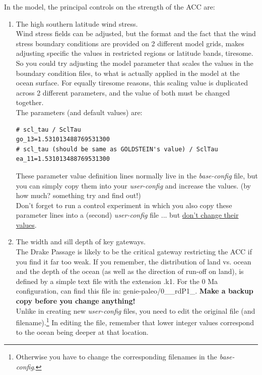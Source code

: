 \begin{enumerate}[noitemsep]
In the model, the principal controls on the strength of the ACC are:
\vspace{1mm}
\begin{enumerate}[noitemsep]
\item The high southern latitude wind stress.
\vspace{1mm}
\\Wind stress fields can be adjusted, but the format and the fact that the wind stress boundary conditions are provided on 2 different model grids, makes adjusting specific the values in restricted regions or latitude bands, tiresome. So you could try adjusting the model parameter that scales the values in the boundary condition files, to what is actually applied in the model at the ocean surface. For equally tiresome reasons, this scaling value is duplicated across 2 different parameters, and the value of both must be changed together.
\vspace{1mm}
\\The parameters (and default values) are:
\vspace{-1mm}\small\begin{verbatim}
# scl_tau / SclTau
go_13=1.531013488769531300
# scl_tau (should be same as GOLDSTEIN's value) / SclTau
ea_11=1.531013488769531300
\end{verbatim}\normalsize\vspace{-1mm}
These parameter value definition lines normally live in the \textit{base-config} file, but you can simply copy them into your \textit{user-config} and increase the values. (by how much? something try and find out!)
\\Don't forget to run a control experiment in which you also copy these parameter lines into a (second) \textit{user-config} file ... but \uline{don't change their values}.

\vspace{1mm}
\item The width and sill depth of key gateways.
\vspace{1mm}
\\The Drake Passage is likely to be the critical gateway restricting the ACC if you find it far too weak. If you remember, the distribution of land vs. ocean and the depth of the ocean (as well as the direction of run-off on land), is defined by a simple text file with the extension \textsf{\footnotesize .k1}. For the 0 Ma configuration, can find this file in: \textsf{\footnotesize genie-paleo/0\_\_rdP1\_}. \textbf{Make a backup copy before you change anything!} \\Unlike in creating new \textit{user-config} files, you need to edit the original file (and filename).\footnote{Otherwise you have to change the corresponding filenames in the \textit{base-config}.} In editing the file, remember that lower integer values correspond to the ocean being deeper at that location.


\end{enumerate}
\end{enumerate}
